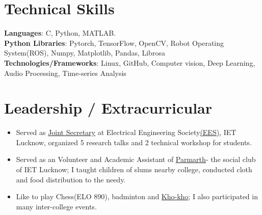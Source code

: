 \documentclass[letterpaper,11pt]{article}
\newcommand{\resumeItem}[1]{
  \item\small{
    {#1 \vspace{-2pt}}
  }
}
\newcommand{\resumeItemListStart}{\begin{itemize}}
\newcommand{\resumeItemListEnd}{\end{itemize}\vspace{-5pt}}
\begin{document}
\section{Technical Skills}
 \begin{itemize}[leftmargin=0.15in, label={}]
    \small{\item{
     \textbf{Languages}{: C, Python, MATLAB. } \\
     \textbf{Python Libraries}{: Pytorch, TensorFlow, OpenCV, Robot Operating System(ROS), Numpy, Matplotlib, Pandas, Librosa} \\
     \textbf{Technologies/Frameworks}{: Linux, GitHub, Computer vision, Deep Learning, Audio Processing, Time-series Analysis} \\
    }}
 \end{itemize}
 \vspace{-18pt}
 

\section{Leadership / Extracurricular}
    \resumeItemListStart
        \resumeItem{Served as \href{https://drive.google.com/file/d/1bca9fBEtqEAgSiWnDeu67OUKe85gFp1m/view?usp=sharingg}{Joint Secretary} at Electrical Engineering Society\href{https://eesietlko.blogspot.com/}{(EES)}, IET Lucknow, organized  5 research talks and 2 technical workshop for students.}
        \vspace{-8pt}
        \resumeItem{Served as an Volunteer and Academic Assistant of \href{http://www.ietparmarth.in/}{Parmarth}- the social club of IET Lucknow; I taught children of slums nearby college, conducted cloth and food distribution to the needy.}
        \vspace{-8pt}
        \resumeItem{Like to play Chess(ELO 890), badminton and \href{https://drive.google.com/file/d/1bNI9BsA8nNTKdviLdMjpC7MgvoRY1Hms/view?usp=sharing}{Kho-kho}; I also participated in many inter-college events.}
    \resumeItemListEnd



\end{document}
